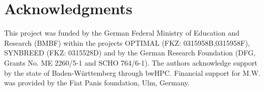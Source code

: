 \documentclass[12pt,titlepage]{article}
\begin{document}
\section{Acknowledgments}
This project was funded by the German Federal Ministry of Education and 
Research (BMBF) within the projects OPTIMAL (FKZ: 0315958B,0315958F),
SYNBREED (FKZ: 0315528D) and by the German Research Foundation 
(DFG, Grants No. ME 2260/5-1 and SCHO 764/6-1).
The authors acknowledge support by the state of Baden-W{\"u}rttemberg through 
bwHPC\@.
Financial support for M.W. was provided by the Fiat Panis foundation, Ulm,
Germany.



\nolinenumbers


\end{document}
